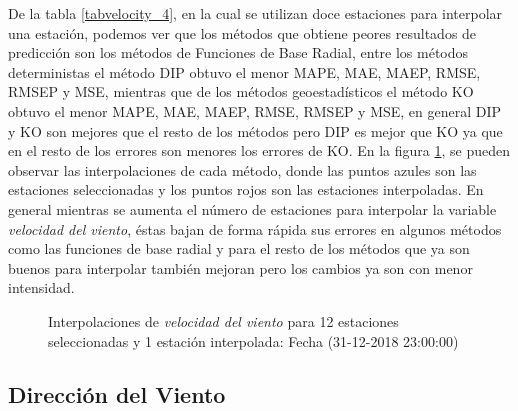 De la tabla \ref{tabvelocity_4}, en la cual se utilizan doce estaciones para interpolar una estación, podemos ver que los métodos que obtiene peores resultados de predicción son los métodos de Funciones de Base Radial, entre los métodos deterministas el método DIP obtuvo el menor MAPE, MAE, MAEP, RMSE, RMSEP y MSE, mientras que de los métodos geoestadísticos el método KO obtuvo el menor MAPE, MAE, MAEP, RMSE, RMSEP y MSE, en general DIP y KO son mejores que el resto de los métodos pero DIP es mejor que KO ya que en el resto de los errores son menores los errores de KO. En la figura \ref{velocityfigure4}, se pueden observar las interpolaciones de cada método, donde las puntos azules son las estaciones seleccionadas y los puntos rojos son las estaciones interpoladas. En general mientras se aumenta el número de estaciones para interpolar la variable  {\em velocidad del viento}, éstas bajan de forma rápida sus errores en algunos métodos como las funciones de base radial y para el resto de los métodos que ya son buenos para interpolar también mejoran pero los cambios ya son con menor intensidad.


\begin{figure}[H]
\centering
{}
\subfigure[KO] {\texttt{[image: ./ok\_12\_8\_26302]}}
\subfigure[KU] {\texttt{[image: ./uk\_12\_8\_26302]}}
\caption{Interpolaciones de  {\em velocidad del viento} para 12 estaciones seleccionadas y 1 estación interpolada: Fecha (31-12-2018 23:00:00)}
\label{velocityfigure4}
\end{figure}





\subsection{Dirección del Viento}

